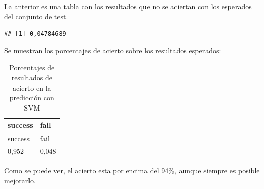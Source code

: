 \documentclass[]{article}
\newenvironment{Shaded}{\begin{snugshade}}{\end{snugshade}}
\newcommand{\KeywordTok}[1]{\textcolor[rgb]{0.13,0.29,0.53}{\textbf{#1}}}
\newcommand{\DataTypeTok}[1]{\textcolor[rgb]{0.13,0.29,0.53}{#1}}
\newcommand{\StringTok}[1]{\textcolor[rgb]{0.31,0.60,0.02}{#1}}
\newcommand{\OperatorTok}[1]{\textcolor[rgb]{0.81,0.36,0.00}{\textbf{#1}}}
\newcommand{\NormalTok}[1]{#1}
\begin{document}
La anterior es una tabla con los resultados que no se aciertan con los
esperados del conjunto de test.

\begin{Shaded}
\end{Shaded}

\begin{verbatim}
## [1] 0,04784689
\end{verbatim}

\begin{Shaded}
\end{Shaded}

Se muestran los porcentajes de acierto sobre los resultados esperados:

\begin{longtable}[]{@{}ll@{}}
\caption{Porcentajes de resultados de acierto en la predicción con
SVM}\tabularnewline
\toprule
success & fail\tabularnewline
\midrule
\endfirsthead
\toprule
success & fail\tabularnewline
\midrule
\endhead
0,952 & 0,048\tabularnewline
\bottomrule
\end{longtable}

Como se puede ver, el acierto esta por encima del 94\%, aunque siempre
es posible mejorarlo.
\end{document}
